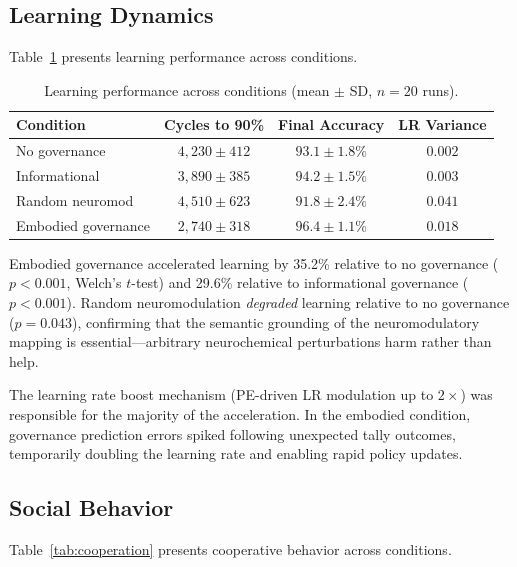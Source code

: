 \documentclass[11pt,a4paper]{article}
\begin{document}
\subsection{Learning Dynamics}

Table~\ref{tab:learning} presents learning performance across conditions.

\begin{table}[h]
\centering
\caption{Learning performance across conditions (mean $\pm$ SD, $n = 20$ runs).}
\label{tab:learning}
\begin{tabular}{lccc}
\toprule
\textbf{Condition} & \textbf{Cycles to 90\%} & \textbf{Final Accuracy} & \textbf{LR Variance} \\
\midrule
No governance        & $4,230 \pm 412$ & $93.1 \pm 1.8\%$ & $0.002$ \\
Informational        & $3,890 \pm 385$ & $94.2 \pm 1.5\%$ & $0.003$ \\
Random neuromod      & $4,510 \pm 623$ & $91.8 \pm 2.4\%$ & $0.041$ \\
Embodied governance  & $2,740 \pm 318$ & $96.4 \pm 1.1\%$ & $0.018$ \\
\bottomrule
\end{tabular}
\end{table}

Embodied governance accelerated learning by 35.2\% relative to no governance ($p < 0.001$, Welch's $t$-test) and 29.6\% relative to informational governance ($p < 0.001$).
Random neuromodulation \emph{degraded} learning relative to no governance ($p = 0.043$), confirming that the semantic grounding of the neuromodulatory mapping is essential---arbitrary neurochemical perturbations harm rather than help.

The learning rate boost mechanism (PE-driven LR modulation up to $2\times$) was responsible for the majority of the acceleration.
In the embodied condition, governance prediction errors spiked following unexpected tally outcomes, temporarily doubling the learning rate and enabling rapid policy updates.

\subsection{Social Behavior}

Table~\ref{tab:cooperation} presents cooperative behavior across conditions.
\end{document}
